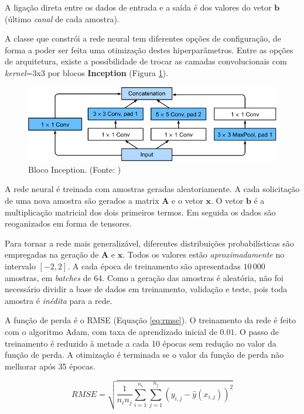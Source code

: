 \documentclass[final,5p]{elsarticle}
\numberwithin{equation}{section}
\begin{document}
    A ligação direta entre os dados de entrada e a saída é dos valores do vetor $\textbf{b}$ (último \emph{canal} de cada amostra).

    A classe que constrói a rede neural tem diferentes opções de configuração, de forma a poder ser feita uma otimização destes hiperparâmetros. Entre as opções de arquitetura, existe a possibilidade de trocar as camadas convolucionais com \emph{kernel}=3x3 por blocos \textbf{Inception} (Figura \ref{fig:inception}).

    \begin{figure}[hbt!]
        \centering
        \includegraphics[width=0.95\columnwidth]{./fig/inception.png}
        \caption{Bloco Inception. (Fonte: \cite{zhang2021dive})}\label{fig:inception}
    \end{figure}

    A rede neural é treinada com amostras geradas aleatoriamente. A cada solicitação de uma nova amostra são gerados a matrix $\textbf{A}$ e o vetor $\textbf{x}$. O vetor $\textbf{b}$ é a multiplicação matricial dos dois primeiros termos. Em seguida os dados são reoganizados em forma de tensores.

    Para tornar a rede mais generalizável, diferentes distribuições probabilísticas são empregadas na geração de $\textbf{A}$ e $\textbf{x}$. Todos os valores estão \emph{aproximadamente} no intervalo $[-2,2]$. A cada época de treinamento são apresentadas $10\,000$ amostras, em \emph{batches} de 64. Como a geração das amostras é aleatória, não foi necessário dividir a base de dados em treinamento, validação e teste, pois toda amostra é \emph{inédita} para a rede.

    A função de perda é o RMSE (Equação \ref{eq:rmse}). O treinamento da rede é feito com o algoritmo Adam, com taxa de aprendizado inicial de $0.01$. O passo de treinamento é reduzido à metade a cada 10 épocas sem redução no valor da função de perda. A otimização é terminada se o valor da função de perda não melhorar após 35 épocas.

    \begin{equation}
        RMSE = \sqrt{\frac{1}{n_in_j}\sum_{i=1}^{n_i} \sum_{j=1}^{n_j} (y_{i,j} - \hat{y}(x_{i,j}))^2} \label{eq:rmse}
    \end{equation}
\end{document}
